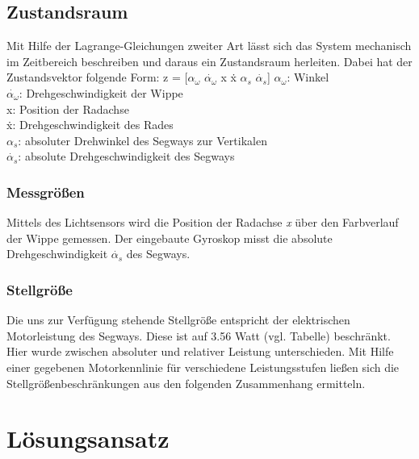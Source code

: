 \documentclass[pdf]{ifacconf}
\begin{document}
	\subsection{Zustandsraum}
	Mit Hilfe der Lagrange-Gleichungen zweiter Art lässt sich das System mechanisch 		im Zeitbereich beschreiben und daraus ein Zustandsraum herleiten.
	Dabei hat der Zustandsvektor folgende Form:
	z = [$\alpha^{}_{\omega}$ $\dot{\alpha^{}_{\omega}}$ x \.{x} $\alpha^{}_{s}$ $\dot{\alpha^{}_{s}}$]%
	$\alpha^{}_{\omega}$: Winkel\\
	$\dot{\alpha^{}_{\omega}}$: Drehgeschwindigkeit der Wippe\\
	x:  Position der Radachse\\
	\.{x}:  Drehgeschwindigkeit des Rades\\
	$\alpha^{}_{s}$: absoluter Drehwinkel des Segways zur Vertikalen\\
	$\dot{\alpha^{}_{s}}$: absolute Drehgeschwindigkeit des Segways\\
	
		\subsubsection{Messgrößen}
		Mittels des Lichtsensors wird die Position der Radachse \textit{x} über den 		Farbverlauf der Wippe gemessen. Der eingebaute Gyroskop misst die absolute Drehgeschwindigkeit $\dot{\alpha^{}_{s}}$ des Segways.
		
		\subsubsection{Stellgröße}
		Die uns zur Verfügung stehende Stellgröße entspricht der elektrischen Motorleistung des Segways. Diese ist auf 3.56 Watt (vgl. Tabelle) beschränkt.
		Hier wurde zwischen absoluter und relativer Leistung unterschieden. Mit Hilfe einer gegebenen Motorkennlinie für verschiedene Leistungsstufen ließen sich die Stellgrößenbeschränkungen aus den folgenden Zusammenhang ermitteln.

	
\section{Lösungsansatz}
\end{document}
